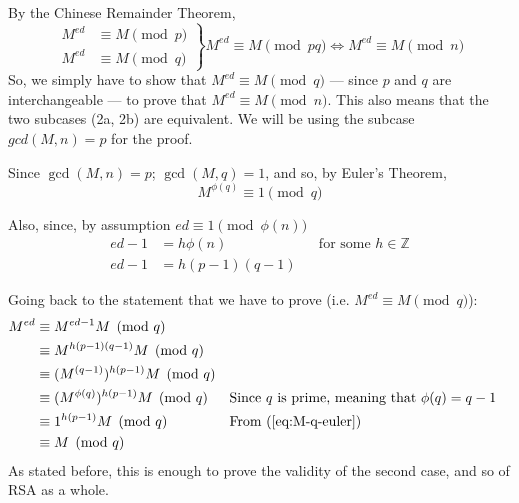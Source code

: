 \documentclass[12pt, titlepage]{article}
\begin{document}
        By the Chinese Remainder Theorem,
        \begin{equation*}
            \left.
                \begin{aligned}
                    M^{ed} &\equiv M \pmod{p}\\
                    M^{ed} &\equiv M \pmod{q}
                \end{aligned}
            \right\}
            M^{ed} \equiv M \pmod{pq} \iff M^{ed} \equiv M \pmod{n}
        \end{equation*}
        So, we simply have to show that $M^{ed} \equiv M \pmod{q}$ --- since $p$ and $q$ are
        interchangeable --- to prove that $M^{ed} \equiv M \pmod{n}$. This also means that
        the two subcases (2a, 2b) are equivalent. We will be using the subcase $gcd(M, n) =
        p$ for the proof.
        
        Since $\gcd(M, n) = p$; $\gcd(M, q) = 1$, and so, by Euler's Theorem,
        \begin{equation} \label{eq:M-q-euler} 
            M^{\phi(q)} \equiv 1 \pmod{q} 
        \end{equation}

        Also, since, by assumption $ed \equiv 1 \pmod{\phi(n)}$
        \begin{align*}
            ed - 1 &= h\phi(n) &&\text{for some } h \in \mathbb{Z}\\
            ed - 1 &= h(p-1)(q-1)
        \end{align*}

        Going back to the statement that we have to prove (i.e. $M^{ed} \equiv M \pmod{q}$):
        \begin{align*}
            M^{ed} &\equiv M^{ed - 1} M \pmod{q} \\
                   &\equiv M^{h(p-1)(q-1)} M \pmod{q} \\
                   &\equiv (M^{(q-1)})^{h(p-1)} M \pmod{q} \\
                   &\equiv (M^{\phi(q)})^{h(p-1)} M \pmod{q} &&\text{Since $q$ is prime,
                   meaning that $\phi(q) = q-1$} \\
                   &\equiv 1^{h(p-1)} M \pmod{q} &&\text{From (\ref{eq:M-q-euler})}\\
                   &\equiv M \pmod{q}
        \end{align*}
        As stated before, this is enough to prove the validity of the second case, and so of
        RSA as a whole.
    
\end{document}
